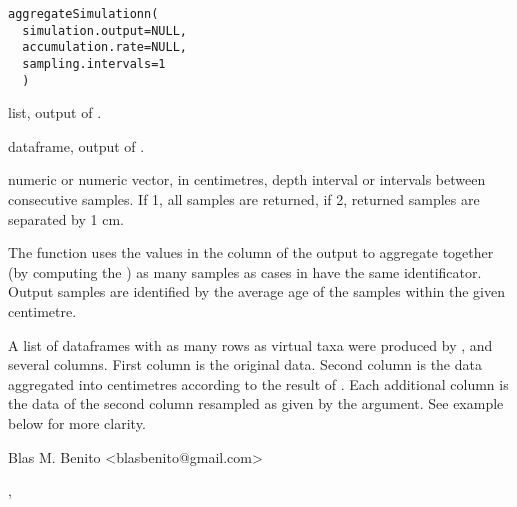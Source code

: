 \documentclass[letterpaper]{book}
\begin{document}
%
\begin{Usage}
\begin{verbatim}
aggregateSimulationn(
  simulation.output=NULL,
  accumulation.rate=NULL,
  sampling.intervals=1
  )
\end{verbatim}
\end{Usage}
%
\begin{Arguments}
\begin{ldescription}
\item[\code{simulation.output}] list, output of .

\item[\code{accumulation.rate}] dataframe, output of .

\item[\code{sampling.intervals}] numeric or numeric vector, in centimetres, depth interval or intervals between consecutive samples. If 1, all samples are returned, if 2, returned samples are separated by 1 cm.
\end{ldescription}
\end{Arguments}
%
\begin{Details}\relax
The function uses the values in the  column of the  output to aggregate together (by computing the ) as many samples as cases in  have the same identificator. Output samples are identified by the average age of the samples within the given centimetre.
\end{Details}
%
\begin{Value}
A list of dataframes with as many rows as virtual taxa were produced by , and several columns. First column is the original data. Second column is the data aggregated into centimetres according to the result of . Each additional column is the data of the second column resampled as given by the  argument. See example below for more clarity.
\end{Value}
%
\begin{Author}\relax
Blas M. Benito  <blasbenito@gmail.com>
\end{Author}
%
\begin{SeeAlso}\relax
{}, 
\end{SeeAlso}
\end{document}
